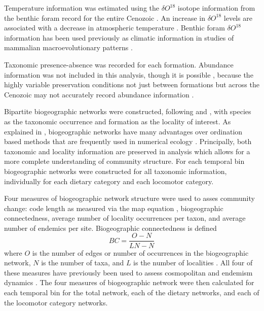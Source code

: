 \documentclass[12pt,letterpaper]{article}
\begin{document}
Temperature information was estimated using the \(\delta O^{18}\) isotope information from the benthic foram record for the entire Cenozoic \citep{Zachos2008}. An increase in \(\delta O^{18}\) levels are associated with a decrease in atmospheric temperature \citep{Zachos2001,Zachos2008}. Benthic foram \(\delta O^{18}\) information has been used previously as climatic information in studies of mammalian macroevolutionary patterns \citep{Alroy2000g,Figueirido2012,Rose2011}.
%
%

Taxonomic presence-absence was recorded for each formation. Abundance information was not included in this analysis, though it is possible \citep{Sidor2013}, because the highly variable preservation conditions not just between formations but across the Cenozoic may not accurately record abundance information \citep{Damuth1982}.

%

Bipartite biogeographic networks were constructed, following \citet{Sidor2013} and \citet{Vilhena2013}, with species as the taxonomic occurrence and formation as the locality of interest. As explained in \citet{Sidor2013}, biogeographic networks have many advantages over ordination based methods that are frequently used in numerical ecology \citep{Legendre2012}. Principally, both taxonomic and locality information are preserved in analysis which allows for a more complete understanding of community structure. For each temporal bin biogeographic networks were constructed for all taxonomic information, individually for each dietary category and each locomotor category.

Four measures of biogeographic network structure were used to asses community change: code length as measured via the map equation \citep{Rosvall2007a,Rosvall2008,Rosvall2010b}, biogeographic connectedness, average number of locality occurrences per taxon, and average number of endemics per site. Biogeographic connectedness is defined 
\begin{equation}
  BC = \frac{O - N}{LN - N}
  \label{eq:bc}
\end{equation}
where \(O\) is the number of edges or number of occurrences in the biogeographic network, \(N\) is the number of taxa, and \(L\) is the number of localities \citep{Sidor2013}. All four of these measures have previously been used to assess cosmopolitan and endemism dynamics \citep{Sidor2013}. The four measures of biogeographic network were then calculated for each temporal bin for the total network, each of the dietary networks, and each of the locomotor category networks.
\end{document}
